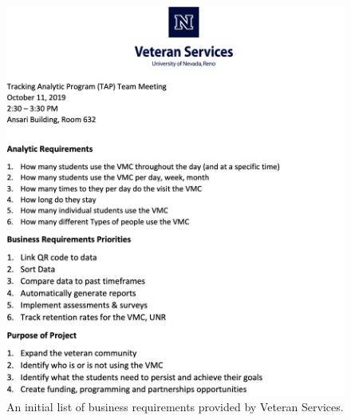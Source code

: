 \begin{figure}[H]
	\begin{centering}
\includegraphics[width=0.90\linewidth, height=1.25\linewidth]{sections/project_related_resources/Business_Requirements_For_TAP.png}
	\caption{An initial list of business requirements provided by Veteran Services.}
	\label{fig:vs_business_reqs}
	\end{centering}
\end{figure}